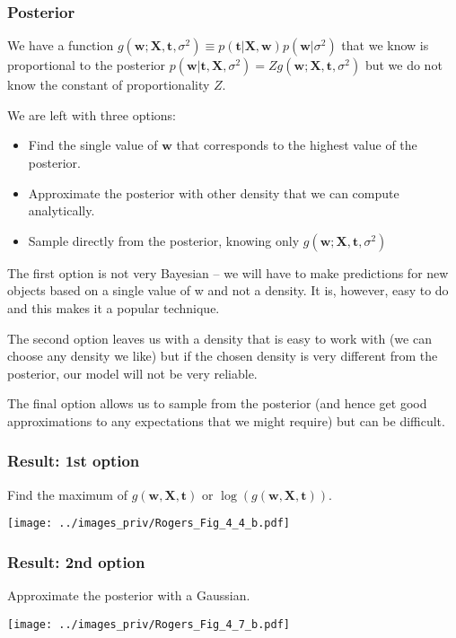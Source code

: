 \documentclass[english,10pt,aspectratio=169,fleqn]{beamer}
\begin{document}
\begin{frame} %
\frametitle{Posterior}

We have a function $g(\mathbf{w}; \mathbf{X},\mathbf{t},\sigma^2) \equiv
p(\mathbf{t} | \mathbf{X},\mathbf{w}) p(\mathbf{w}|\sigma^2)$
that we know is proportional to the posterior $p(\mathbf{w} | \mathbf{t}, \mathbf{X}, 
\sigma^2) = Z g(\mathbf{w}; \mathbf{X},\mathbf{t},\sigma^2)$
but we do not know the constant of proportionality $Z$.

We are left with three options:
\begin{itemize}
\item Find the single value of $\mathbf{w}$ that corresponds to the highest
value of the posterior.
\item Approximate the posterior with other density that we can compute analytically.
\item Sample directly from the posterior, knowing only
$g(\mathbf{w}; \mathbf{X},\mathbf{t},\sigma^2)$
\end{itemize}

The first option is not very Bayesian – we will have to make predictions for new
objects based on a single value of w and not a density. It is, however, easy to do and
this makes it a popular technique.

The second option leaves us with a density that
is easy to work with (we can choose any density we like) but if the chosen density
is very different from the posterior, our model will not be very reliable.

The final
option allows us to sample from the posterior (and hence get good approximations
to any expectations that we might require) but can be difficult.

\end{frame}

\begin{frame}
\frametitle{Result: 1st option}

Find the maximum of $g(\mathbf{w},\mathbf{X},\mathbf{t})$ or
$\log(g(\mathbf{w},\mathbf{X},\mathbf{t}))$.

{\centering
\texttt{[image: ../images\_priv/Rogers\_Fig\_4\_4\_b.pdf]}
\par}

\end{frame}


\begin{frame} %
\frametitle{Result: 2nd option}

Approximate the posterior with a Gaussian.

{\centering
\texttt{[image: ../images\_priv/Rogers\_Fig\_4\_7\_b.pdf]}
\par}
\end{frame}
\end{document}
